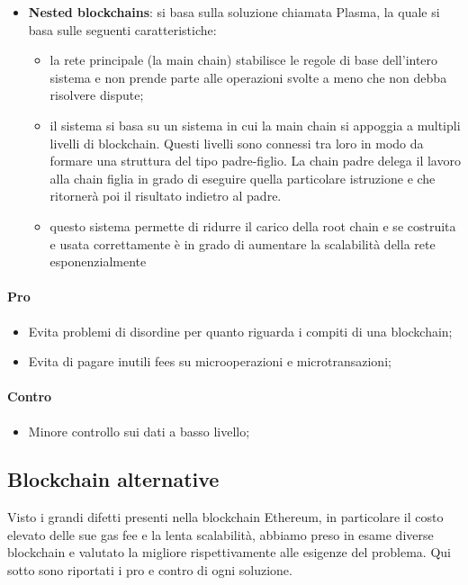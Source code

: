     \begin{itemize}
        \item \textbf{Nested blockchains}: si basa sulla soluzione chiamata Plasma, la quale si basa sulle seguenti caratteristiche:
        \begin{itemize}
            \item la rete principale (la main chain) stabilisce le regole di base dell’intero sistema e non prende parte alle operazioni svolte a meno che non debba risolvere dispute;
            \item il sistema si basa su un sistema in cui la main chain si appoggia a multipli livelli di blockchain. Questi livelli sono connessi tra loro in modo da formare una struttura del tipo padre-figlio. 
            La chain padre delega il lavoro alla chain figlia in grado di eseguire quella particolare istruzione e che ritornerà poi il risultato indietro al padre.
            \item questo sistema permette di ridurre il carico della root chain e se costruita e usata correttamente è in grado di aumentare la scalabilità della rete esponenzialmente     
        \end{itemize}
    \end{itemize}
    \paragraph{Pro}
    \begin{itemize}
        \item Evita problemi di disordine per quanto riguarda i compiti di una blockchain;
        \item Evita di pagare inutili fees su microoperazioni e microtransazioni;
    \end{itemize}
    \paragraph{Contro}
    \begin{itemize}
        \item Minore controllo sui dati a basso livello;        
    \end{itemize}

\subsection{Blockchain alternative}
Visto i grandi difetti presenti nella blockchain Ethereum, in particolare il costo elevato delle sue gas fee e la lenta scalabilità, abbiamo preso in esame diverse blockchain e valutato la migliore 
rispettivamente alle esigenze del problema. Qui sotto sono riportati i pro e contro di ogni soluzione.
